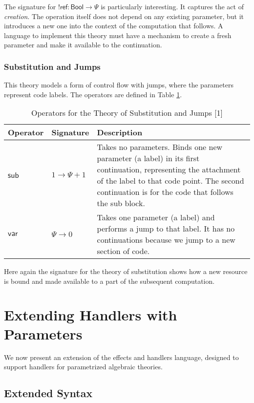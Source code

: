 \documentclass{article}
\theoremstyle{definition}
\theoremstyle{remark}
\newcommand\bool{\mathsf{Bool}}
\newcommand\newref{\mathsf{ref}}
\newcommand\sub{\mathsf{sub}}
\newcommand\var{\mathsf{var}}
\newcommand\eff{{!}}
\begin{document}
The signature for $\eff\newref: \bool\to\Psi$ is particularly interesting.
It captures the act of \emph{creation}. The operation itself does not depend on any existing parameter, but it introduces a new one into the context of the computation that follows.
A language to implement this theory must have a mechanism to create a fresh parameter and make it available to the continuation.

\subsubsection{Substitution and Jumps}

This theory models a form of control flow with jumps, where the parameters represent code labels. The operators are defined in Table \ref{tab:subst}.

\begin{table}[h!]
  \centering
  \begin{tabular}{l l p{8cm}}
    \hline
    \textbf{Operator} & \textbf{Signature} & \textbf{Description} \\
    \hline
    $\sub$ & $1 \to \Psi + 1$ & Takes no parameters. Binds one new parameter (a label) in its first continuation, representing the attachment of the label to that code point.
    The second continuation is for the code that follows the sub block. \\
    $\var$ & $\Psi \to 0$     & Takes one parameter (a label) and performs a jump to that label. It has no continuations because we jump to a new section of code. \\
    \hline
  \end{tabular}
  \caption{Operators for the Theory of Substitution and Jumps [1]}
  \label{tab:subst}
\end{table}

Here again the signature for the theory of substitution shows how a new resource is bound and made available to a part of the subsequent computation.

\section{Extending Handlers with Parameters}

We now present an extension of the effects and handlers language, designed to support handlers for parametrized algebraic theories.

\subsection{Extended Syntax}
\end{document}
